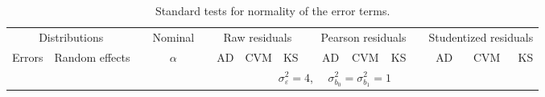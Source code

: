 


\begin{table}[ht]
\caption{\label{tab:eval1}Standard tests for normality of the error terms.}
\begin{scriptsize}
\begin{center}
\begin{tabular}{ll p{.1cm} c p{.1cm} rrr p{.1cm} rrr p{.1cm} rrr}
  \hline
  \multicolumn{2}{c}{Distributions}& & Nominal & &  \multicolumn{3}{c}{Raw residuals} & & \multicolumn{3}{c}{Pearson residuals} & & \multicolumn{3}{c}{Studentized residuals}\\ \cline{1-2} \cline{6-8} \cline{10-12} \cline{14-16}
  Errors & Random effects & & $\alpha$ & & AD & CVM & KS & & AD & CVM & KS & & AD & CVM & KS \\ 
   \hline
& && && \multicolumn{9}{c}{$\sigma_{\varepsilon}^2 = 4$, \ \ $\sigma_{b_0}^2 = \sigma_{b_1}^2 = 1$} \\ \cline{6-16}


\end{tabular}
\end{center}
\end{scriptsize}
\end{table}
